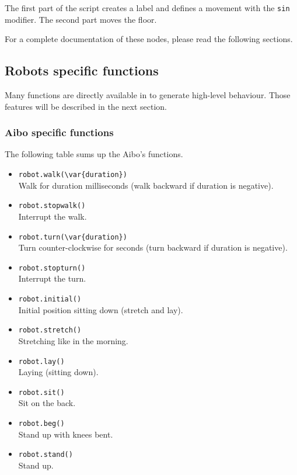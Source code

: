 The first part of the script creates a label and defines a movement
with the \lstinline|sin| modifier. The second part moves the floor.

For a complete documentation of these nodes, please read the following
sections.

\subsection{Robots specific functions}

Many functions are directly available in \us to generate high-level
behaviour. Those features will be described in the next section.


\subsubsection{Aibo specific functions}

The following table sums up the Aibo's functions.

\begin{itemize}
\item \lstinline|robot.walk(\var{duration})|\\
  Walk for duration milliseconds (walk backward if duration is negative).
\item \lstinline|robot.stopwalk()|\\
  Interrupt the walk.
\item \lstinline|robot.turn(\var{duration})|\\
  Turn counter-clockwise for  seconds (turn backward if
  duration is negative).
\item \lstinline|robot.stopturn()|\\
  Interrupt the turn.
\item \lstinline|robot.initial()|\\
  Initial position sitting down (stretch and lay).
\item \lstinline|robot.stretch()|\\
  Stretching like in the morning.
\item \lstinline|robot.lay()|\\
  Laying (sitting down).
\item \lstinline|robot.sit()|\\
  Sit on the back.
\item \lstinline|robot.beg()|\\
  Stand up with knees bent.
\item \lstinline|robot.stand()|\\
  Stand up.
\end{itemize}

